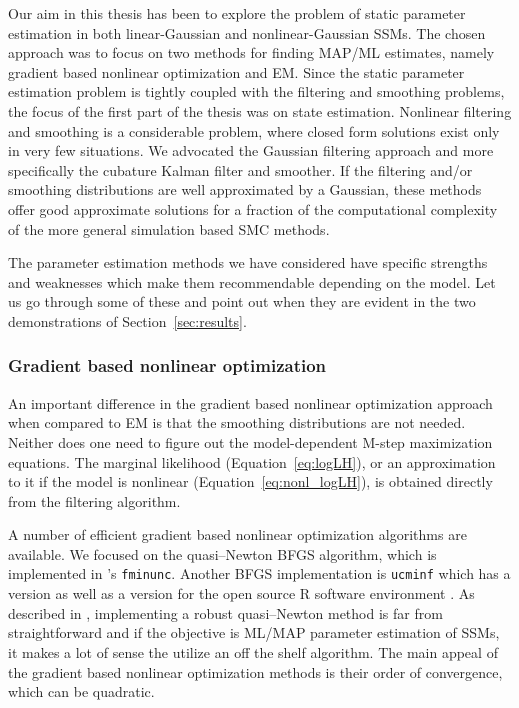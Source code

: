 Our aim in this thesis has been to explore the problem of static parameter estimation
in both linear-Gaussian and nonlinear-Gaussian SSMs. The chosen approach was to focus
on two methods for finding MAP/ML estimates, namely gradient based nonlinear optimization
and EM. Since the static
parameter estimation problem is tightly coupled with the filtering and smoothing problems, the
focus of the first part of the thesis was on state estimation. 
Nonlinear filtering and smoothing is
a considerable problem, where closed form solutions exist only in very few situations.
We advocated the Gaussian filtering approach and more specifically the cubature Kalman
filter and smoother. If the filtering and/or smoothing distributions are well approximated
by a Gaussian, these methods offer good approximate solutions for a fraction of
the computational complexity of the more general simulation based SMC methods.
 
The parameter estimation methods we have considered have specific strengths and weaknesses
which make them recommendable depending on the model. Let us go through
some of these and point out when they are evident in the two demonstrations of
Section~\ref{sec:results}.

\subsubsection*{Gradient based nonlinear optimization}

An important difference in the gradient based nonlinear optimization 
approach when compared to EM is that the smoothing distributions
are not needed. Neither does one need to figure out the model-dependent
M-step maximization equations. The marginal likelihood (Equation~\eqref{eq:logLH}), 
or an approximation to it if the model is nonlinear (Equation~\eqref{eq:nonl_logLH}), 
is obtained directly from the filtering algorithm.

A number of efficient gradient based nonlinear optimization
algorithms are available. We focused on the quasi--Newton BFGS algorithm,
which is implemented in \matlab's \texttt{fminunc}. Another BFGS implementation
is \texttt{ucminf} which has a \matlab{} version as well as a version for the open source
R software environment \parencite{Nielsen2000,rucminf2012,r2012}. 
As described in \textcite{Nielsen2000}, implementing a robust quasi--Newton method
is far from straightforward and if the objective is ML/MAP parameter estimation of SSMs,
it makes a lot of sense the utilize an off the shelf algorithm.
The main appeal of the gradient based
nonlinear optimization methods is their order of convergence, which can
be quadratic.  

